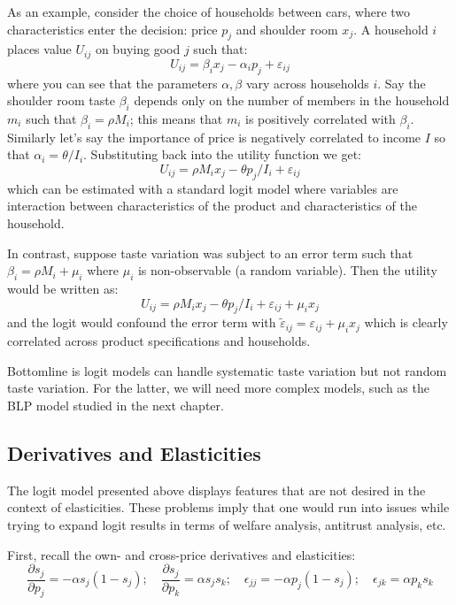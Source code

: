 As an example, consider the choice of households between cars, where two characteristics enter the decision: price $p_j$ and shoulder room $x_j$. A household $i$ places value $U_{ij}$ on buying good $j$ such that: $$U_{ij} = \beta_i x_j - \alpha_i p_j + \varepsilon_{ij} $$ where you can see that the parameters $\alpha, \beta$ vary across households $i$. Say the shoulder room taste $\beta_i$ depends only on the number of members in the household $m_i$ such that $\beta_i = \rho M_i$; this means that $m_i$ is positively correlated with $\beta_i$. Similarly let's say the importance of price is negatively correlated to income $I$ so that $\alpha_i = \theta/I_i$. Substituting back into the utility function we get: $$U_{ij} = \rho M_i x_j - \theta p_j/I_i + \varepsilon_{ij} $$ which can be estimated with a standard logit model where variables are interaction between characteristics of the product and characteristics of the household.

In contrast, suppose taste variation was subject to an error term such that $\beta_i = \rho M_i + \mu_i$ where $\mu_i$ is non-observable (a random variable). Then the utility would be written as: $$U_{ij} = \rho M_i x_j - \theta p_j/I_i + \varepsilon_{ij} + \mu_ix_j $$ and the logit would confound the error term with $\tilde\varepsilon_{ij} = \varepsilon_{ij} + \mu_ix_j$ which is clearly correlated across product specifications and households.

Bottomline is logit models can handle systematic taste variation but not random taste variation. For the latter, we will need more complex models, such as the BLP model studied in the next chapter.

\subsection{Derivatives and Elasticities}

The logit model presented above displays features that are not desired in the context of elasticities. These problems imply that one would run into issues while trying to expand logit results in terms of welfare analysis, antitrust analysis, etc.

First, recall the own- and cross-price derivatives and elasticities:
$$ \frac{\partial s_j}{\partial p_j}  = -\alpha s_j (1 - s_j) ; \quad \frac{\partial s_j}{\partial p_k}  = \alpha s_j s_k ; \quad \epsilon_{jj}  = -\alpha p_j (1 - s_j) ; \quad \epsilon_{jk}  = \alpha p_k s_k $$

